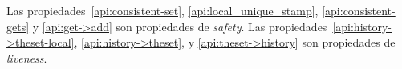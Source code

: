 Las propiedades~\ref{api:consistent-set}, \ref{api:local_unique_stamp},
\ref{api:consistent-gets} y \ref{api:get->add} son propiedades de \textit{safety}.
%
Las propiedades~\ref{api:history->theset-local}, \ref{api:history->theset},
y \ref{api:theset->history}
son propiedades de \textit{liveness}.

